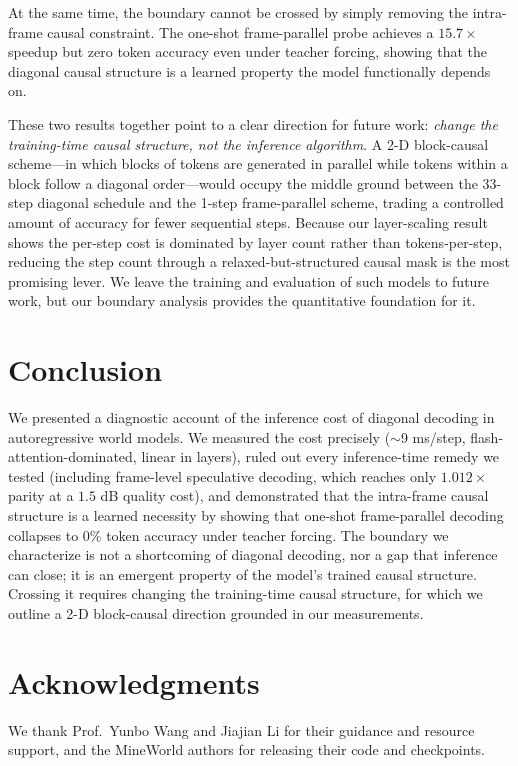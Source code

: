 \documentclass[10pt, twocolumn]{article}
\begin{document}
At the same time, the boundary cannot be crossed by simply removing the intra-frame causal constraint. The one-shot frame-parallel probe achieves a $15.7\times$ speedup but zero token accuracy even under teacher forcing, showing that the diagonal causal structure is a learned property the model functionally depends on.

These two results together point to a clear direction for future work: \emph{change the training-time causal structure, not the inference algorithm}. A 2-D block-causal scheme---in which blocks of tokens are generated in parallel while tokens within a block follow a diagonal order---would occupy the middle ground between the 33-step diagonal schedule and the 1-step frame-parallel scheme, trading a controlled amount of accuracy for fewer sequential steps. Because our layer-scaling result shows the per-step cost is dominated by layer count rather than tokens-per-step, reducing the step count through a relaxed-but-structured causal mask is the most promising lever. We leave the training and evaluation of such models to future work, but our boundary analysis provides the quantitative foundation for it.

\section{Conclusion}
\label{sec:conclusion}

We presented a diagnostic account of the inference cost of diagonal decoding in autoregressive world models. We measured the cost precisely ($\sim$9 ms/step, flash-attention-dominated, linear in layers), ruled out every inference-time remedy we tested (including frame-level speculative decoding, which reaches only $1.012\times$ parity at a $1.5$ dB quality cost), and demonstrated that the intra-frame causal structure is a learned necessity by showing that one-shot frame-parallel decoding collapses to $0\%$ token accuracy under teacher forcing. The boundary we characterize is not a shortcoming of diagonal decoding, nor a gap that inference can close; it is an emergent property of the model's trained causal structure. Crossing it requires changing the training-time causal structure, for which we outline a 2-D block-causal direction grounded in our measurements.

\section*{Acknowledgments}
We thank Prof.\ Yunbo Wang and Jiajian Li for their guidance and resource support, and the MineWorld authors for releasing their code and checkpoints.
\end{document}
